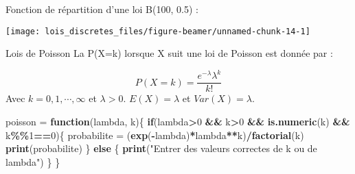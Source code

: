 \documentclass[
  ignorenonframetext,
]{beamer}
\newenvironment{Shaded}{\begin{snugshade}}{\end{snugshade}}
\newcommand{\ControlFlowTok}[1]{\textcolor[rgb]{0.13,0.29,0.53}{\textbf{#1}}}
\newcommand{\DecValTok}[1]{\textcolor[rgb]{0.00,0.00,0.81}{#1}}
\newcommand{\FunctionTok}[1]{\textcolor[rgb]{0.13,0.29,0.53}{\textbf{#1}}}
\newcommand{\NormalTok}[1]{#1}
\newcommand{\OtherTok}[1]{\textcolor[rgb]{0.56,0.35,0.01}{#1}}
\newcommand{\SpecialCharTok}[1]{\textcolor[rgb]{0.81,0.36,0.00}{\textbf{#1}}}
\newcommand{\StringTok}[1]{\textcolor[rgb]{0.31,0.60,0.02}{#1}}
\begin{document}
\begin{frame}{Fonction de répartition d'une loi B(100, 0.5) :}
\protect\hypertarget{fonction-de-ruxe9partition-dune-loi-b100-0.5}{}
\begin{center}\texttt{[image: lois\_discretes\_files/figure-beamer/unnamed-chunk-14-1]} \end{center}
\end{frame}

\begin{frame}[fragile]{Lois de Poisson}
\protect\hypertarget{lois-de-poisson}{}
La P(X=k) lorsque X suit une loi de Poisson est donnée par :

\[P(X=k) = \frac{e^{-\lambda} \lambda^{k}}{k!}\] Avec
\(k=0, 1,\cdots,\infty\) et \(\lambda>0\). \(E(X)=\lambda\) et
\(Var(X)=\lambda\).

\begin{Shaded}
\begin{Highlighting}[]
\NormalTok{poisson }\OtherTok{=} \ControlFlowTok{function}\NormalTok{(lambda, k)\{}
  \ControlFlowTok{if}\NormalTok{(lambda}\SpecialCharTok{\textgreater{}}\DecValTok{0} \SpecialCharTok{\&\&}\NormalTok{ k}\SpecialCharTok{\textgreater{}}\DecValTok{0} \SpecialCharTok{\&\&} \FunctionTok{is.numeric}\NormalTok{(k) }\SpecialCharTok{\&\&}\NormalTok{ k}\SpecialCharTok{\%\%}\DecValTok{1}\SpecialCharTok{==}\DecValTok{0}\NormalTok{)\{}
\NormalTok{    probabilite }\OtherTok{=}\NormalTok{ (}\FunctionTok{exp}\NormalTok{(}\SpecialCharTok{{-}}\NormalTok{lambda)}\SpecialCharTok{*}\NormalTok{lambda}\SpecialCharTok{**}\NormalTok{k)}\SpecialCharTok{/}\FunctionTok{factorial}\NormalTok{(k)}
    \FunctionTok{print}\NormalTok{(probabilite)}
\NormalTok{  \} }\ControlFlowTok{else}\NormalTok{ \{}
    \FunctionTok{print}\NormalTok{(}\StringTok{"Entrer des valeurs correctes de k ou de lambda"}\NormalTok{)}
\NormalTok{  \}}
\NormalTok{\}}
\end{Highlighting}
\end{Shaded}
\end{frame}
\end{document}
